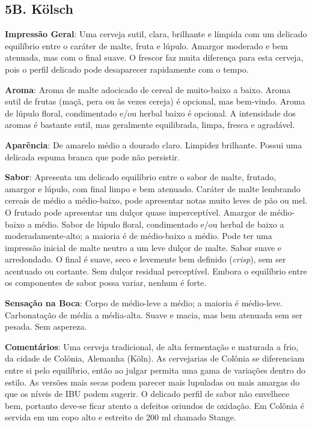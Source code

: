 \subsection*{5B. Kölsch}
\textbf{Impressão Geral}: Uma cerveja sutil, clara, brilhante e límpida com um delicado equilíbrio entre o caráter de malte, fruta e lúpulo. Amargor moderado e bem atenuada, mas com o final suave. O frescor faz muita diferença para esta cerveja, pois o perfil delicado pode desaparecer rapidamente com o tempo.

\textbf{Aroma}: Aroma de malte adocicado de cereal de muito-baixo a baixo. Aroma sutil de frutas (maçã, pera ou às vezes cereja) é opcional, mas bem-vindo. Aroma de lúpulo floral, condimentado e/ou herbal baixo é opcional. A intensidade dos aromas é bastante sutil, mas geralmente equilibrada, limpa, fresca e agradável.

\textbf{Aparência}: De amarelo médio a dourado claro. Limpidez brilhante. Possui uma delicada espuma branca que pode não persistir.

\textbf{Sabor}: Apresenta um delicado equilíbrio entre o sabor de malte, frutado, amargor e lúpulo, com final limpo e bem atenuado. Caráter de malte lembrando cereais de médio a médio-baixo, pode apresentar notas muito leves de pão ou mel. O frutado pode apresentar um dulçor quase imperceptível. Amargor de médio-baixo a médio. Sabor de lúpulo floral, condimentado e/ou herbal de baixo a moderadamente-alto; a maioria é de médio-baixo a médio. Pode ter uma impressão inicial de malte neutro a um leve dulçor de malte. Sabor suave e arredondado. O final é suave, seco e levemente bem definido (\textit{crisp}), sem ser acentuado ou cortante. Sem dulçor residual perceptível. Embora o equilíbrio entre os componentes de sabor possa variar, nenhum é forte.

\textbf{Sensação na Boca}: Corpo de médio-leve a médio; a maioria é médio-leve. Carbonatação de média a média-alta. Suave e macia, mas bem atenuada sem ser pesada. Sem aspereza.

\textbf{Comentários}: Uma cerveja tradicional, de alta fermentação e maturada a frio, da cidade de Colônia, Alemanha (Köln). As cervejarias de Colônia se diferenciam entre si pelo equilíbrio, então ao julgar permita uma gama de variações dentro do estilo. As versões mais secas podem parecer mais lupuladas ou mais amargas do que os níveis de IBU podem sugerir. O delicado perfil de sabor não envelhece bem, portanto deve-se ficar atento a defeitos oriundos de oxidação. Em Colônia é servida em um copo alto e estreito de 200 ml chamado Stange.

